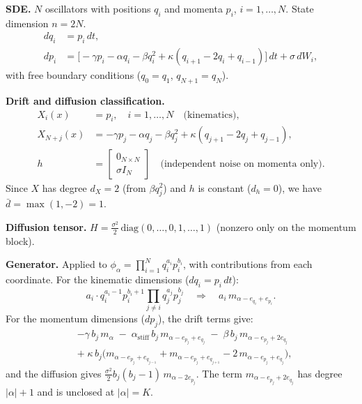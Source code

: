 \documentclass{article}
\theoremstyle{definition}
\begin{document}
\textbf{SDE.}
$N$ oscillators with positions $q_i$ and momenta $p_i$,
$i = 1, \ldots, N$. State dimension $n = 2N$.
\begin{align}
    dq_i &= p_i\, dt,
    \nonumber\\
    dp_i &= \bigl[-\gamma p_i - \alpha q_i - \beta q_i^2
           + \kappa(q_{i+1} {-} 2q_i {+} q_{i-1})\bigr]\, dt
           + \sigma\, dW_i,
\end{align}
with free boundary conditions ($q_0 = q_1$, $q_{N+1} = q_N$).

\textbf{Drift and diffusion classification.}
\begin{align}
    X_i(x) &= p_i, \quad i = 1, \ldots, N \quad\text{(kinematics)},
    \nonumber\\
    X_{N+j}(x) &= -\gamma p_j - \alpha q_j - \beta q_j^2
    + \kappa(q_{j+1} {-} 2q_j {+} q_{j-1}),
    \nonumber\\
    h &= \begin{bmatrix}0_{N\times N}\\ \sigma I_N\end{bmatrix}
    \quad\text{(independent noise on momenta only)}.
\end{align}
Since $X$ has degree $d_X = 2$ (from $\beta q_j^2$) and $h$ is constant
($d_h = 0$), we have $\bar{d} = \max(1, -2) = 1$.

\textbf{Diffusion tensor.}
$H = \frac{\sigma^2}{2}\,
\mathrm{diag}(0, \ldots, 0, 1, \ldots, 1)$
(nonzero only on the momentum block).

\textbf{Generator.}
Applied to $\phi_\alpha = \prod_{i=1}^{N} q_i^{a_i} p_i^{b_i}$,
with contributions from each coordinate.
For the kinematic dimensions ($dq_i = p_i\, dt$):
\begin{equation}
    a_i \cdot q_i^{a_i - 1} p_i^{b_i + 1} \prod_{j \ne i} q_j^{a_j} p_j^{b_j}
    \quad\Longrightarrow\quad
    a_i\, m_{\alpha - e_{q_i} + e_{p_i}}.
\end{equation}
For the momentum dimensions ($dp_j$), the drift terms give:
\begin{align}
    &{-}\gamma\, b_j\, m_\alpha
    \;-\; \alpha_{\mathrm{stiff}}\, b_j\, m_{\alpha - e_{p_j} + e_{q_j}}
    \;-\; \beta\, b_j\, m_{\alpha - e_{p_j} + 2e_{q_j}}
    \nonumber\\
    &+\; \kappa\, b_j\bigl(
    m_{\alpha - e_{p_j} + e_{q_{j-1}}}
    + m_{\alpha - e_{p_j} + e_{q_{j+1}}}
    - 2\, m_{\alpha - e_{p_j} + e_{q_j}}\bigr),
\end{align}
and the diffusion gives
$\frac{\sigma^2}{2} b_j(b_j{-}1)\, m_{\alpha - 2e_{p_j}}$.
The term $m_{\alpha - e_{p_j} + 2e_{q_j}}$ has degree
$|\alpha| + 1$ and is unclosed at $|\alpha| = K$.
\end{document}
